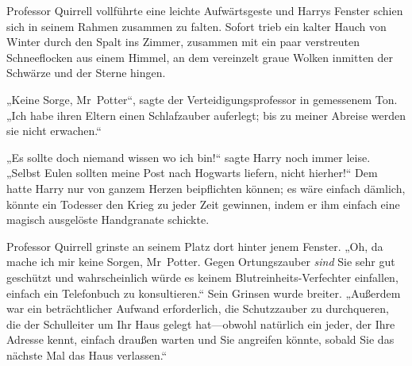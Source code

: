 Professor Quirrell vollführte eine leichte Aufwärtsgeste und Harrys Fenster schien sich in seinem Rahmen zusammen zu falten. Sofort trieb ein kalter Hauch von Winter durch den Spalt ins Zimmer, zusammen mit ein paar verstreuten Schneeflocken aus einem Himmel, an dem vereinzelt graue Wolken inmitten der Schwärze und der Sterne hingen.

„Keine Sorge, Mr~Potter“, sagte der Verteidigungsprofessor in gemessenem Ton. „Ich habe ihren Eltern einen Schlafzauber auferlegt; bis zu meiner Abreise werden sie nicht erwachen.“

„Es sollte doch niemand wissen wo ich bin!“ sagte Harry noch immer leise. „Selbst Eulen sollten meine Post nach Hogwarts liefern, nicht hierher!“ Dem hatte Harry nur von ganzem Herzen beipflichten können; es wäre einfach dämlich, könnte ein Todesser den Krieg zu jeder Zeit gewinnen, indem er ihm einfach eine magisch ausgelöste Handgranate schickte.

Professor Quirrell grinste an seinem Platz dort hinter jenem Fenster. „Oh, da mache ich mir keine Sorgen, Mr~Potter. Gegen Ortungszauber \emph{sind} Sie sehr gut geschützt und wahrscheinlich würde es keinem Blutreinheits-Verfechter einfallen, einfach ein Telefonbuch zu konsultieren.“ Sein Grinsen wurde breiter. „Außerdem war ein beträchtlicher Aufwand erforderlich, die Schutzzauber zu durchqueren, die der Schulleiter um Ihr Haus gelegt hat—obwohl natürlich ein jeder, der Ihre Adresse kennt, einfach draußen warten und Sie angreifen könnte, sobald Sie das nächste Mal das Haus verlassen.“

